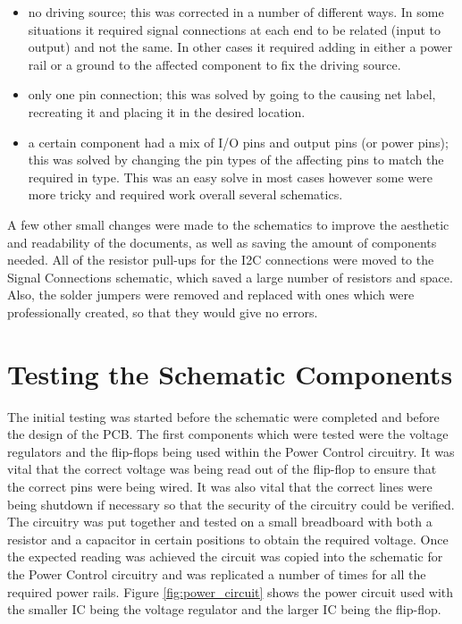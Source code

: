 \begin{itemize}
\item no driving source; this was corrected in a number of different ways. In some situations it required signal connections at each end to be related (input to output) and not the same. In other cases it required adding in either a power rail or a ground to the affected component to fix the driving source. 
\item only one pin connection; this was solved by going to the causing net label, recreating it and placing it in the desired location. 
\item a certain component had a mix of I/O pins and output pins (or power pins); this was solved by changing the pin types of the affecting pins to match the required in type. This was an easy solve in most cases however some were more tricky and required work overall several schematics. 
\end{itemize}

A few other small changes were made to the schematics to improve the aesthetic and readability of the documents, as well as saving the amount of components needed. All of the resistor pull-ups for the I2C connections were moved to the Signal Connections schematic, which saved a large number of resistors and space. Also, the solder jumpers were removed and replaced with ones which were professionally created, so that they would give no errors.


\section{Testing the Schematic Components}

The initial testing was started before the schematic were completed and before the design of the PCB. The first components which were tested were the voltage regulators and the flip-flops being used within the Power Control circuitry. It was vital that the correct voltage was being read out of the flip-flop to ensure that the correct pins were being wired. It was also vital that the correct lines were being shutdown if necessary so that the security of the circuitry could be verified. The circuitry was put together and tested on a small breadboard with both a resistor and a capacitor in certain positions to obtain the required voltage. Once the expected reading was achieved the circuit was copied into the schematic for the Power Control circuitry and was replicated a number of times for all the required power rails. Figure \ref{fig:power_circuit} shows the power circuit used with the smaller IC being the voltage regulator and the larger IC being the flip-flop.

